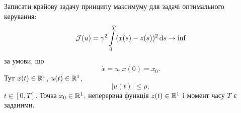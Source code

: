 \begin{solution}
\end{solution}

\begin{problem}
    Записати крайову задачу принципу максимуму для задачі оптимального керування:
    \begin{equation*}
        \mathcal{J}(u) = \gamma^2 \displaystyle\int\limits_0^T (x(s) - z(s))^2 \, \mathrm{d} s \to \inf
    \end{equation*}
    за умови, що
    \begin{equation*}
        \dot x = u, x(0) = x_0.
    \end{equation*}
    Тут $x(t) \in \mathbb{R}^1$, $u(t) \in \mathbb{R}^1$,
    \begin{equation*}
        |u(t)| \le \rho,
    \end{equation*}
    $t \in [0, T]$. Точка $x_0 \in \mathbb{R}^1$, неперервна функція $z(t) \in \mathbb{R}^1$ і момент часу $T$ є заданими.
\end{problem}

